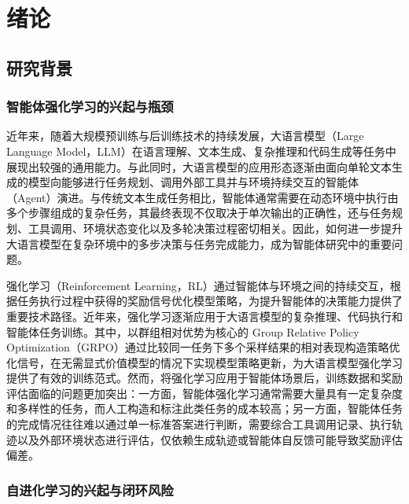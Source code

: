 \chapter{绪论}

\section{研究背景}

\subsection{智能体强化学习的兴起与瓶颈}

近年来，随着大规模预训练与后训练技术的持续发展，大语言模型（Large Language Model，LLM）在语言理解、文本生成、复杂推理和代码生成等任务中展现出较强的通用能力。与此同时，大语言模型的应用形态逐渐由面向单轮文本生成的模型向能够进行任务规划、调用外部工具并与环境持续交互的智能体（Agent）演进。与传统文本生成任务相比，智能体通常需要在动态环境中执行由多个步骤组成的复杂任务，其最终表现不仅取决于单次输出的正确性，还与任务规划、工具调用、环境状态变化以及多轮决策过程密切相关。因此，如何进一步提升大语言模型在复杂环境中的多步决策与任务完成能力，成为智能体研究中的重要问题。

强化学习（Reinforcement Learning，RL）通过智能体与环境之间的持续交互，根据任务执行过程中获得的奖励信号优化模型策略，为提升智能体的决策能力提供了重要技术路径。近年来，强化学习逐渐应用于大语言模型的复杂推理、代码执行和智能体任务训练。其中，以群组相对优势为核心的 Group Relative Policy Optimization（GRPO）通过比较同一任务下多个采样结果的相对表现构造策略优化信号，在无需显式价值模型的情况下实现模型策略更新，为大语言模型强化学习提供了有效的训练范式。然而，将强化学习应用于智能体场景后，训练数据和奖励评估面临的问题更加突出：一方面，智能体强化学习通常需要大量具有一定复杂度和多样性的任务，而人工构造和标注此类任务的成本较高；另一方面，智能体任务的完成情况往往难以通过单一标准答案进行判断，需要综合工具调用记录、执行轨迹以及外部环境状态进行评估，仅依赖生成轨迹或智能体自反馈可能导致奖励评估偏差。

\subsection{自进化学习的兴起与闭环风险}


